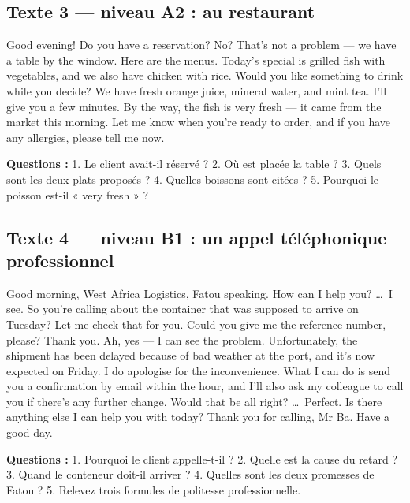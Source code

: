 \subsection{Texte 3 --- niveau A2 : au restaurant}
\begin{dialoguebox}
\begin{anglais}
Good evening! Do you have a reservation? No? That's not a problem --- we have a table by the
window. Here are the menus. Today's special is grilled fish with vegetables, and we also
have chicken with rice. Would you like something to drink while you decide? We have fresh
orange juice, mineral water, and mint tea. I'll give you a few minutes. By the way, the fish
is very fresh --- it came from the market this morning. Let me know when you're ready to
order, and if you have any allergies, please tell me now.
\end{anglais}
\end{dialoguebox}
\textbf{Questions :} 1. Le client avait-il réservé ? 2. Où est placée la table ?
3. Quels sont les deux plats proposés ? 4. Quelles boissons sont citées ?
5. Pourquoi le poisson est-il « very fresh » ?

\subsection{Texte 4 --- niveau B1 : un appel téléphonique professionnel}
\begin{dialoguebox}
\begin{anglais}
Good morning, West Africa Logistics, Fatou speaking. How can I help you? \ldots\ I see. So
you're calling about the container that was supposed to arrive on Tuesday? Let me check that
for you. Could you give me the reference number, please? Thank you. Ah, yes --- I can see
the problem. Unfortunately, the shipment has been delayed because of bad weather at the port,
and it's now expected on Friday. I do apologise for the inconvenience. What I can do is send
you a confirmation by email within the hour, and I'll also ask my colleague to call you if
there's any further change. Would that be all right? \ldots\ Perfect. Is there anything else
I can help you with today? Thank you for calling, Mr Ba. Have a good day.
\end{anglais}
\end{dialoguebox}
\textbf{Questions :} 1. Pourquoi le client appelle-t-il ? 2. Quelle est la cause du retard ?
3. Quand le conteneur doit-il arriver ? 4. Quelles sont les deux promesses de Fatou ?
5. Relevez trois formules de politesse professionnelle.

